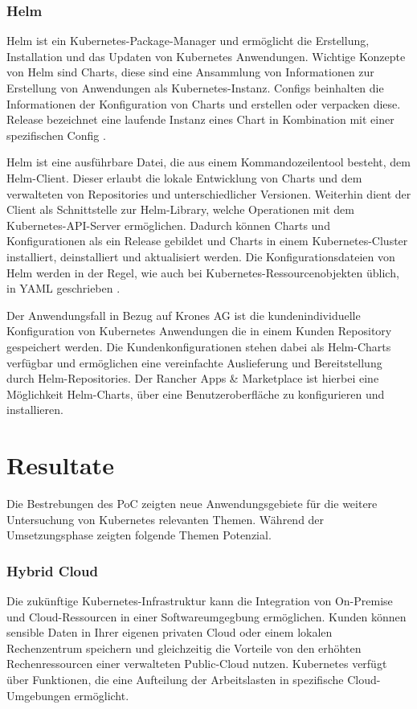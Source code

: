 \subsubsection{Helm}
Helm ist ein Kubernetes-Package-Manager und ermöglicht die Erstellung, Installation und das Updaten von Kubernetes Anwendungen.
Wichtige Konzepte von Helm sind Charts, diese sind eine Ansammlung von Informationen zur Erstellung von Anwendungen als Kubernetes-Instanz. 
Configs beinhalten die Informationen der Konfiguration von Charts und erstellen oder verpacken diese.
Release bezeichnet eine laufende Instanz eines Chart in Kombination mit einer spezifischen Config \cite{helm}.

Helm ist eine ausführbare Datei, die aus einem Kommandozeilentool besteht, dem Helm-Client.
Dieser erlaubt die lokale Entwicklung von Charts und dem verwalteten von Repositories und unterschiedlicher Versionen.
Weiterhin dient der Client als Schnittstelle zur Helm-Library, welche Operationen mit dem Kubernetes-API-Server ermöglichen.
Dadurch können Charts und Konfigurationen als ein Release gebildet
und Charts in einem Kubernetes-Cluster installiert, deinstalliert und aktualisiert werden.
Die Konfigurationsdateien von Helm werden in der Regel, wie auch bei Kubernetes-Ressourcenobjekten üblich, in YAML geschrieben \cite{helm}.

Der Anwendungsfall in Bezug auf Krones AG ist die kundenindividuelle Konfiguration von Kubernetes Anwendungen die in einem Kunden Repository gespeichert werden.
Die Kundenkonfigurationen stehen dabei als Helm-Charts verfügbar und ermöglichen eine vereinfachte Auslieferung und Bereitstellung durch Helm-Repositories.
Der Rancher Apps \& Marketplace ist hierbei eine Möglichkeit Helm-Charts, über eine Benutzeroberfläche zu konfigurieren und installieren.

\newpage

\section{Resultate}
Die Bestrebungen des PoC zeigten neue Anwendungsgebiete für die weitere Untersuchung von Kubernetes relevanten Themen.
Während der Umsetzungsphase zeigten folgende Themen Potenzial.

\subsubsection{Hybrid Cloud}
Die zukünftige Kubernetes-Infrastruktur kann die Integration von On-Premise und Cloud-Ressourcen in einer Softwareumgegbung ermöglichen.
Kunden können sensible Daten in Ihrer eigenen privaten Cloud oder einem lokalen Rechenzentrum speichern und gleichzeitig die
Vorteile von den erhöhten Rechenressourcen einer verwalteten Public-Cloud nutzen.
Kubernetes verfügt über Funktionen, die eine Aufteilung der Arbeitslasten in spezifische Cloud-Umgebungen ermöglicht.

